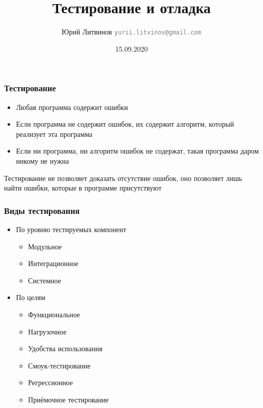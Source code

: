 \documentclass[xetex,mathserif,serif]{beamer}
\title{Тестирование и отладка}
\author[Юрий Литвинов]{Юрий Литвинов \newline \textcolor{gray}{\small\texttt{yurii.litvinov@gmail.com}}}
\date{15.09.2020}
\begin{document}
    
    \frame{\titlepage}
    
    \begin{frame}
        \frametitle{Тестирование}
        \begin{itemize}
            \item Любая программа содержит ошибки
            \item Если программа не содержит ошибок, их содержит алгоритм, который реализует эта программа
            \item Если ни программа, ни алгоритм ошибок не содержат, такая программа даром никому не нужна
        \end{itemize}
        \vspace{1cm}
        Тестирование не позволяет доказать отсутствие ошибок, оно позволяет лишь найти ошибки, которые в программе присутствуют
    \end{frame}

    \begin{frame}
        \frametitle{Виды тестирования}
        \begin{itemize}
            \item По уровню тестируемых компонент
            \begin{itemize}
                \item Модульное
                \item Интеграционное
                \item Системное
            \end{itemize}
            \item По целям
            \begin{itemize}
                \item Функциональное
                \item Нагрузочное
                \item Удобства использования
                \item Смоук-тестирование
                \item Регрессионное
                \item Приёмочное тестирование
            \end{itemize}
        \end{itemize}
    \end{frame}
\end{document}
